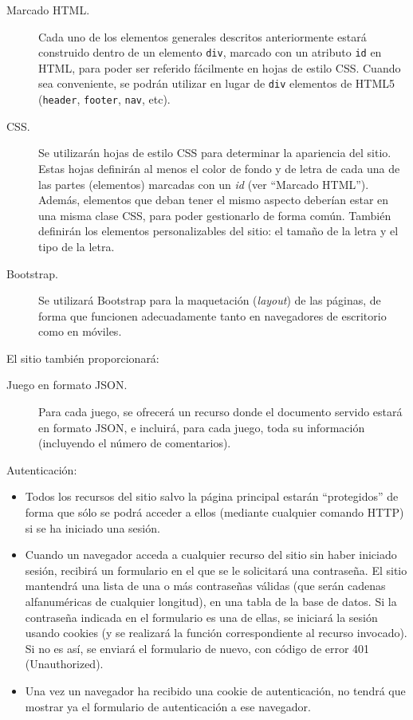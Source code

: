 \begin{description}
\item[Marcado HTML.] Cada uno de los elementos generales descritos anteriormente estará construido dentro de un elemento \texttt{div}, marcado con un atributo \texttt{id} en HTML, para poder ser referido fácilmente en hojas de estilo CSS. Cuando sea conveniente, se podrán utilizar en lugar de \texttt{div} elementos de HTML5 (\texttt{header}, \texttt{footer}, \texttt{nav}, etc).

\item[CSS.] Se utilizarán hojas de estilo CSS para determinar la apariencia del sitio. Estas hojas definirán al menos el color de fondo y de letra de cada una de las partes (elementos) marcadas con un \emph{id} (ver ``Marcado HTML''). Además, elementos que deban tener el mismo aspecto deberían estar en una misma clase CSS, para poder gestionarlo de forma común. También definirán los elementos personalizables del sitio: el tamaño de la letra y el tipo de la letra.

\item[Bootstrap.] Se utilizará Bootstrap para la maquetación (\emph{layout}) de las páginas, de forma que funcionen adecuadamente tanto en navegadores de escritorio como en móviles.
\end{description}

El sitio también proporcionará:

\begin{description}
\item[Juego en formato JSON.] Para cada juego, se ofrecerá un recurso donde el documento servido estará en formato JSON, e incluirá, para cada juego, toda su información (incluyendo el número de comentarios).

\end{description}


Autenticación:

\begin{itemize}
\item Todos los recursos del sitio salvo la página principal estarán ``protegidos'' de forma que sólo se podrá acceder a ellos (mediante cualquier comando HTTP) si se ha iniciado una sesión.
  
\item Cuando un navegador acceda a cualquier recurso del sitio sin haber iniciado sesión, recibirá un formulario en el que se le solicitará una contraseña. El sitio mantendrá una lista de una o más contraseñas válidas (que serán cadenas alfanuméricas de cualquier longitud), en una tabla de la base de datos. Si la contraseña indicada en el formulario es una de ellas, se iniciará la sesión usando cookies (y se realizará la función correspondiente al recurso invocado). Si no es así, se enviará el formulario de nuevo, con código de error 401 (Unauthorized).

\item Una vez un navegador ha recibido una cookie de autenticación, no tendrá que mostrar ya el formulario de autenticación a ese navegador.
  
\end{itemize}


